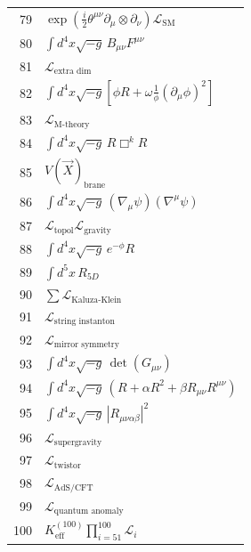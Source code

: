 \documentclass[12pt,a4paper]{article}
\begin{document}
\begin{longtable}{r p{}}
	79 & \(\displaystyle \exp\left(\frac{i}{2}\theta^{\mu\nu}\partial_\mu\otimes\partial_\nu\right)\mathcal{L}_{\text{SM}}\) \\
	80 & \(\displaystyle \int d^4x\sqrt{-g}\,B_{\mu\nu}F^{\mu\nu}\) \\
	81 & \(\displaystyle \mathcal{L}_{\text{extra dim}}\) \\
	82 & \(\displaystyle \int d^4x\sqrt{-g}\left[\phi R + \omega\frac{1}{\phi}(\partial_\mu\phi)^2\right]\) \\
	83 & \(\displaystyle \mathcal{L}_{\text{M-theory}}\) \\
	84 & \(\displaystyle \int d^4x\sqrt{-g}\,R\Box^k R\) \\
	85 & \(\displaystyle V(\vec{X})_{\text{brane}}\) \\
	86 & \(\displaystyle \int d^4x\sqrt{-g}\,(\nabla_\mu\psi)(\nabla^\mu\psi)\) \\
	87 & \(\displaystyle \mathcal{L}_{\text{topol}}\mathcal{L}_{\text{gravity}}\) \\
	88 & \(\displaystyle \int d^4x\sqrt{-g}\,e^{-\phi}R\) \\
	89 & \(\displaystyle \int d^5x\,R_{5D}\) \\
	90 & \(\displaystyle \sum\mathcal{L}_{\text{Kaluza-Klein}}\) \\
	91 & \(\displaystyle \mathcal{L}_{\text{string instanton}}\) \\
	92 & \(\displaystyle \mathcal{L}_{\text{mirror symmetry}}\) \\
	93 & \(\displaystyle \int d^4x\sqrt{-g}\,\det(G_{\mu\nu})\) \\
	94 & \(\displaystyle \int d^4x\sqrt{-g}\,\left(R + \alpha R^2 + \beta R_{\mu\nu}R^{\mu\nu}\right)\) \\
	95 & \(\displaystyle \int d^4x\sqrt{-g}\,|R_{\mu\nu\alpha\beta}|^2\) \\
	96 & \(\displaystyle \mathcal{L}_{\text{supergravity}}\) \\
	97 & \(\displaystyle \mathcal{L}_{\text{twistor}}\) \\
	98 & \(\displaystyle \mathcal{L}_{\text{AdS/CFT}}\) \\
	99 & \(\displaystyle \mathcal{L}_{\text{quantum anomaly}}\) \\
	100 & \(\displaystyle K^{(100)}_{\mathrm{eff}}\prod_{i=51}^{100}\mathcal{L}_i\) \\
	

\end{longtable}
\end{document}
